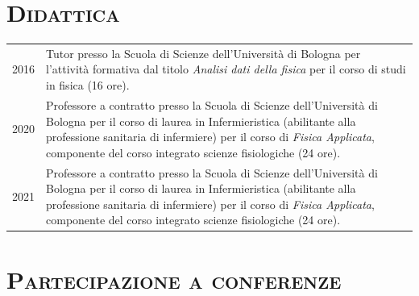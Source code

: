 \documentclass[a4paper,11pt]{article}
\begin{document}
\vspace*{0.5cm}
\section*{\scshape{Didattica}}

\begin{tabular}{lp{14cm}}

  2016 & Tutor presso la Scuola di Scienze dell'Università di Bologna per l'attività formativa dal titolo \emph{Analisi dati della fisica} per il corso di studi in fisica (16 ore). \\
  2020 & Professore a contratto presso la Scuola di Scienze dell'Università di Bologna per il corso di laurea in Infermieristica (abilitante alla professione sanitaria di infermiere) per il corso di \emph{Fisica Applicata}, componente del corso integrato scienze fisiologiche (24 ore). \\
  2021 & Professore a contratto presso la Scuola di Scienze dell'Università di Bologna per il corso di laurea in Infermieristica (abilitante alla professione sanitaria di infermiere) per il corso di \emph{Fisica Applicata}, componente del corso integrato scienze fisiologiche (24 ore). \\

\end{tabular}


\vspace*{0.5cm}
\section*{\scshape{Partecipazione a conferenze}}
\end{document}
